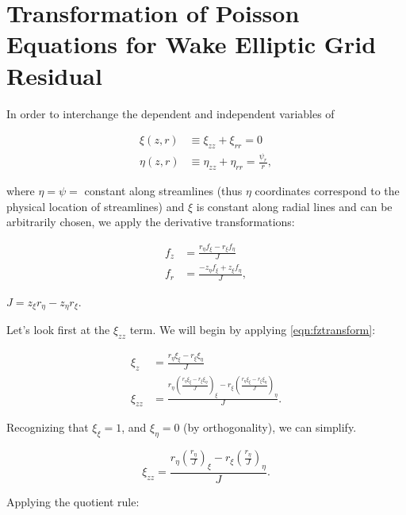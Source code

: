 \chapter{Transformation of Poisson Equations for Wake Elliptic Grid Residual}
\label{app:poissontransform}

In order to interchange the dependent and independent variables of

\begin{subequations}
	\begin{align}
		\xi(z,r) &\equiv \xi_{zz} + \xi_{rr} = 0\\
		\label{eqn:nzr}
		\eta(z,r) &\equiv \eta_{zz} + \eta_{rr} = \frac{\psi_r}{r},
	\end{align}
\end{subequations}

\noindent where \(\eta = \psi =\) constant along streamlines (thus \(\eta\) coordinates correspond to the physical location of streamlines) and \(\xi\) is constant along radial lines and can be arbitrarily chosen,
we apply the derivative transformations:

\begin{subequations}
	\begin{align}
		\label{eqn:fztransform}
		f_z &= \frac{r_\eta f_\xi - r_\xi f_\eta}{J} \\
		\label{eqn:fytransform}
		f_r &= \frac{- z_\eta f_\xi + z_\xi f_\eta}{J},
	\end{align}
\end{subequations}

\where \(J = z_\xi r_\eta - z_\eta r_\xi\).

Let's look first at the \(\xi_{zz}\) term.
%
We will begin by applying \cref{eqn:fztransform}:

\begin{align}
	\xi_z &= \frac{r_\eta \xi_\xi - r_\xi \xi_\eta}{J} \\
	\xi_{zz} &= \frac{r_\eta \left(\frac{r_\eta \xi_\xi - r_\xi \xi_\eta}{J}\right)_\xi - r_\xi \left(\frac{r_\eta \xi_\xi - r_\xi \xi_\eta}{J}\right)_\eta}{J}.
\end{align}

\noindent Recognizing that \(\xi_\xi = 1\), and \(\xi_\eta = 0\) (by orthogonality), we can simplify.

\[
\xi_{zz} = \frac{r_\eta \left(\frac{r_\eta }{J}\right)_\xi - r_\xi \left(\frac{r_\eta}{J}\right)_\eta}{J}.
\]

\noindent Applying the quotient rule:

